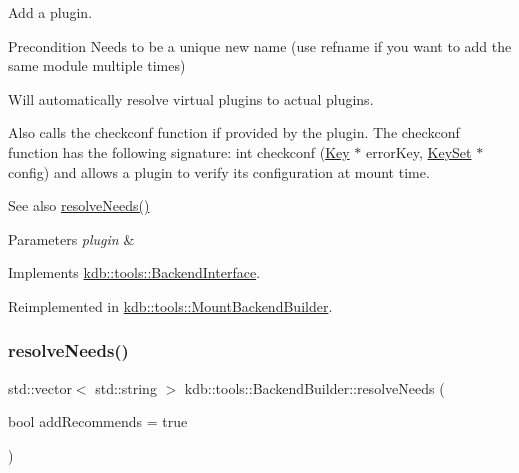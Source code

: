 Add a plugin. 

\begin{DoxyPrecond}{Precondition}
Needs to be a unique new name (use refname if you want to add the same module multiple times)
\end{DoxyPrecond}
Will automatically resolve virtual plugins to actual plugins.

Also calls the checkconf function if provided by the plugin. The checkconf function has the following signature\+: int checkconf (\hyperlink{classkdb_1_1Key}{Key} $\ast$ error\+Key, \hyperlink{classkdb_1_1KeySet}{Key\+Set} $\ast$ config) and allows a plugin to verify its configuration at mount time.

\begin{DoxySeeAlso}{See also}
\hyperlink{classkdb_1_1tools_1_1BackendBuilder_a6e6c23716dc72ef68f8acfd71fc802a9}{resolve\+Needs()} 
\end{DoxySeeAlso}

\begin{DoxyParams}{Parameters}
{\em plugin} & \\
\hline
\end{DoxyParams}


Implements \hyperlink{classkdb_1_1tools_1_1BackendInterface}{kdb\+::tools\+::\+Backend\+Interface}.



Reimplemented in \hyperlink{classkdb_1_1tools_1_1MountBackendBuilder_a2603e75436a49fc66696c1b41b27efb9}{kdb\+::tools\+::\+Mount\+Backend\+Builder}.

\mbox{\label{classkdb_1_1tools_1_1BackendBuilder_a6e6c23716dc72ef68f8acfd71fc802a9}} 
\subsubsection{\texorpdfstring{resolve\+Needs()}{resolveNeeds()}}
{\footnotesize\ttfamily std\+::vector$<$ std\+::string $>$ kdb\+::tools\+::\+Backend\+Builder\+::resolve\+Needs (\begin{DoxyParamCaption}\item[{bool}]{add\+Recommends = {\ttfamily true} }\end{DoxyParamCaption})}



